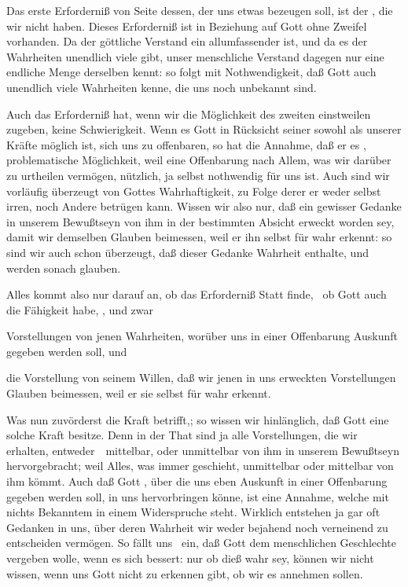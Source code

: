 \begin{aufza}
\item Das erste Erforderniß von Seite dessen, der uns etwas bezeugen soll, ist der , die wir nicht haben. Dieses Erforderniß ist in Beziehung auf Gott ohne Zweifel vorhanden. Da der göttliche Verstand ein allumfassender ist, und da es der Wahrheiten unendlich viele gibt, unser menschliche Verstand dagegen nur eine endliche Menge derselben kennt: so folgt mit Nothwendigkeit, daß Gott auch unendlich viele Wahrheiten kenne, die uns noch unbekannt sind.
\item Auch das  Erforderniß hat, wenn wir die Möglichkeit des zweiten einstweilen zugeben, keine Schwierigkeit. Wenn es Gott in Rücksicht seiner sowohl als unserer Kräfte möglich ist, sich uns zu offenbaren, so hat die Annahme, daß er es , problematische Möglichkeit, weil eine Offenbarung nach Allem, was wir darüber zu urtheilen vermögen, nützlich, ja selbst nothwendig für uns ist. Auch sind wir vorläufig überzeugt von Gottes Wahrhaftigkeit, zu Folge derer er weder selbst irren, noch Andere betrügen kann. Wissen wir also nur, daß ein gewisser Gedanke in unserem Bewußtseyn von ihm in der bestimmten Absicht erweckt worden sey, damit wir demselben Glauben beimessen, weil er ihn selbst für wahr erkennt: so sind wir auch schon überzeugt, daß dieser Gedanke Wahrheit enthalte, und werden sonach glauben.
\item Alles kommt also nur darauf an, ob das  Erforderniß Statt finde, \dh\ ob Gott auch die Fähigkeit habe, , und zwar
\begin{aufzb}
\item Vorstellungen von jenen Wahrheiten, worüber uns in einer Offenbarung Auskunft gegeben werden soll, und
\item die Vorstellung von seinem Willen, daß wir jenen in uns erweckten Vorstellungen Glauben beimessen, weil er sie selbst für wahr erkennt.
\end{aufzb}
\item Was nun zuvörderst die Kraft betrifft,; so wissen wir hinlänglich, daß Gott eine solche Kraft besitze. Denn in der That sind ja alle Vorstellungen, die wir erhalten, entweder~\ mittelbar, oder unmittelbar von ihm in unserem Bewußtseyn hervorgebracht; weil Alles, was immer geschieht, unmittelbar oder mittelbar von ihm kömmt. Auch daß Gott , über die uns eben Auskunft in einer Offenbarung gegeben werden soll, in uns hervorbringen könne, ist eine Annahme, welche mit nichts Bekanntem in einem Widerspruche steht. Wirklich entstehen ja gar oft Gedanken in uns, über deren Wahrheit wir weder bejahend noch verneinend zu entscheiden vermögen. So fällt uns \zB\ ein, daß Gott dem menschlichen Geschlechte vergeben wolle, wenn es sich bessert: nur ob dieß wahr sey, können wir nicht wissen, wenn uns Gott nicht zu erkennen gibt, ob wir es annehmen sollen.

\end{aufza}
